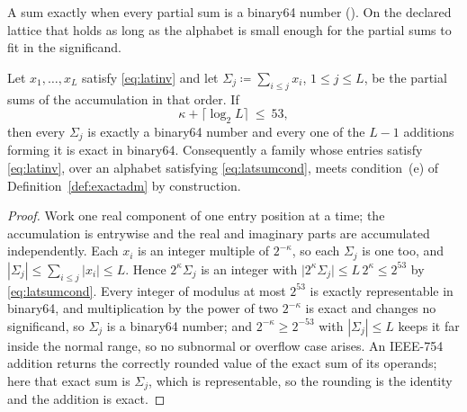 
A sum  exactly when every partial sum is a binary64
number (). On the declared lattice
that holds as long as the alphabet is small enough for the partial sums to
fit in the significand.

\begin{lemma}\label{lem:latsum}
Let $x_1,\dots,x_L$ satisfy \eqref{eq:latinv} and let
$\Sigma_j\coloneqq\sum_{i\le j}x_i$, $1\le j\le L$, be the partial sums of the
accumulation in that order. If
\begin{equation}\label{eq:latsumcond}
  \kappa+\big\lceil\log_2L\big\rceil\ \le\ 53 ,
\end{equation}
then every $\Sigma_j$ is exactly a binary64 number and every one of the $L-1$
additions forming it is exact in binary64. Consequently a family whose entries
satisfy \eqref{eq:latinv}, over an alphabet satisfying
\eqref{eq:latsumcond}, meets condition~(e) of Definition~\ref{def:exactadm} by
construction.
\end{lemma}

\begin{proof}
Work one real component of one entry position at a time; the accumulation is
entrywise and the real and imaginary parts are accumulated independently. Each
$x_i$ is an integer multiple of $2^{-\kappa}$, so each $\Sigma_j$ is one too,
and $|\Sigma_j|\le\sum_{i\le j}|x_i|\le L$. Hence $2^{\kappa}\Sigma_j$ is an
integer with $\big|2^{\kappa}\Sigma_j\big|\le L\,2^{\kappa}\le2^{53}$ by
\eqref{eq:latsumcond}. Every integer of modulus at most $2^{53}$ is exactly
representable in binary64, and multiplication by the power of two
$2^{-\kappa}$ is exact and changes no significand, so $\Sigma_j$ is a binary64
number; and $2^{-\kappa}\ge2^{-53}$ with $|\Sigma_j|\le L$ keeps it far
inside the normal range, so no subnormal or overflow case arises. An IEEE-754
addition returns the correctly rounded value of the exact sum of its operands;
here that exact sum is $\Sigma_j$, which is representable, so the rounding is
the identity and the addition is exact.
\end{proof}
